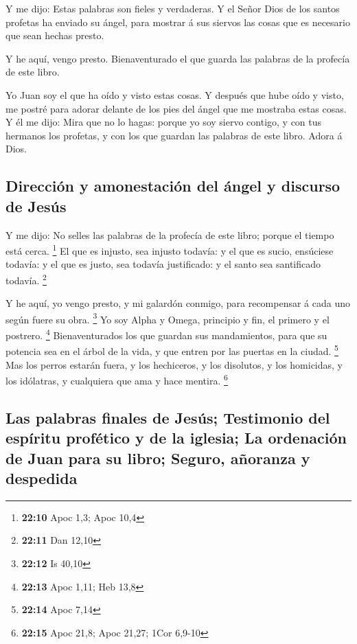  Y me dijo: Estas palabras son fieles y verdaderas. Y el
Señor Dios de los santos profetas ha enviado su ángel, para mostrar á
sus siervos las cosas que es necesario que sean hechas presto.

 Y he aquí, vengo presto. Bienaventurado el que guarda las
palabras de la profecía de este libro.

 Yo Juan soy el que ha oído y visto estas cosas. Y después
que hube oído y visto, me postré para adorar delante de los pies del
ángel que me mostraba estas cosas.  Y él me dijo: Mira que
no lo hagas: porque yo soy siervo contigo, y con tus hermanos los
profetas, y con los que guardan las palabras de este libro. Adora á
Dios.

\hypertarget{direcciuxf3n-y-amonestaciuxf3n-del-uxe1ngel-y-discurso-de-jesuxfas}{%
\subsection{Dirección y amonestación del ángel y discurso de
Jesús}\label{direcciuxf3n-y-amonestaciuxf3n-del-uxe1ngel-y-discurso-de-jesuxfas}}

 Y me dijo: No selles las palabras de la profecía de este
libro; porque el tiempo está cerca. \footnote{\textbf{22:10} Apoc 1,3;
  Apoc 10,4}  El que es injusto, sea injusto todavía: y el
que es sucio, ensúciese todavía: y el que es justo, sea todavía
justificado: y el santo sea santificado todavía. \footnote{\textbf{22:11}
  Dan 12,10}

 Y he aquí, yo vengo presto, y mi galardón conmigo, para
recompensar á cada uno según fuere su obra. \footnote{\textbf{22:12} Is
  40,10}  Yo soy Alpha y Omega, principio y fin, el primero
y el postrero. \footnote{\textbf{22:13} Apoc 1,11; Heb 13,8}
 Bienaventurados los que guardan sus mandamientos, para que
su potencia sea en el árbol de la vida, y que entren por las puertas en
la ciudad. \footnote{\textbf{22:14} Apoc 7,14}  Mas los
perros estarán fuera, y los hechiceros, y los disolutos, y los
homicidas, y los idólatras, y cualquiera que ama y hace mentira.
\footnote{\textbf{22:15} Apoc 21,8; Apoc 21,27; 1Cor 6,9-10}

\hypertarget{las-palabras-finales-de-jesuxfas-testimonio-del-espuxedritu-profuxe9tico-y-de-la-iglesia-la-ordenaciuxf3n-de-juan-para-su-libro-seguro-auxf1oranza-y-despedida}{%
\subsection{Las palabras finales de Jesús; Testimonio del espíritu
profético y de la iglesia; La ordenación de Juan para su libro; Seguro,
añoranza y
despedida}\label{las-palabras-finales-de-jesuxfas-testimonio-del-espuxedritu-profuxe9tico-y-de-la-iglesia-la-ordenaciuxf3n-de-juan-para-su-libro-seguro-auxf1oranza-y-despedida}}


